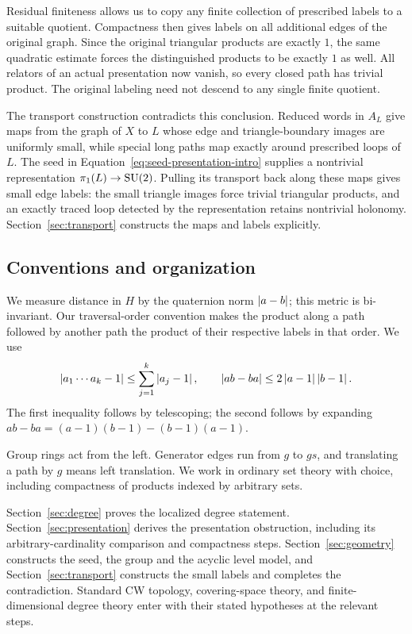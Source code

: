 Residual finiteness allows us to copy any finite collection of prescribed labels to a suitable quotient. Compactness then gives labels on all additional edges of the original graph. Since the original triangular products are exactly $1$, the same quadratic estimate forces the distinguished products to be exactly $1$ as well. All relators of an actual presentation now vanish, so every closed path has trivial product. The original labeling need not descend to any single finite quotient.

The transport construction contradicts this conclusion. Reduced words in $A_L$ give maps from the graph of $X$ to $L$ whose edge and triangle-boundary images are uniformly small, while special long paths map exactly around prescribed loops of $L$. The seed in Equation~\eqref{eq:seed-presentation-intro} supplies a nontrivial representation $\pi_1(L)\to\operatorname{SU}(2)$. Pulling its transport back along these maps gives small edge labels: the small triangle images force trivial triangular products, and an exactly traced loop detected by the representation retains nontrivial holonomy. Section~\ref{sec:transport} constructs the maps and labels explicitly.

\subsection*{Conventions and organization}

We measure distance in $H$ by the quaternion norm $\left\lvert a-b\right\rvert$; this metric is bi-invariant. Our traversal-order convention makes the product along a path followed by another path the product of their respective labels in that order. We use
\begin{equation}
\label{eq:quaternion-basic}
 \left\lvert a_1\cdots a_k-1\right\rvert\le\sum_{j=1}^k\left\lvert a_j-1\right\rvert,
 \qquad
 \left\lvert ab-ba\right\rvert\le2\left\lvert a-1\right\rvert\left\lvert b-1\right\rvert.
\end{equation}
The first inequality follows by telescoping; the second follows by expanding
$ab-ba=(a-1)(b-1)-(b-1)(a-1)$.

Group rings act from the left. Generator edges run from $g$ to $gs$, and translating a path by $g$ means left translation. We work in ordinary set theory with choice, including compactness of products indexed by arbitrary sets.

Section~\ref{sec:degree} proves the localized degree statement. Section~\ref{sec:presentation} derives the presentation obstruction, including its arbitrary-cardinality comparison and compactness steps. Section~\ref{sec:geometry} constructs the seed, the group and the acyclic level model, and Section~\ref{sec:transport} constructs the small labels and completes the contradiction. Standard CW topology, covering-space theory, and finite-dimensional degree theory enter with their stated hypotheses at the relevant steps.
